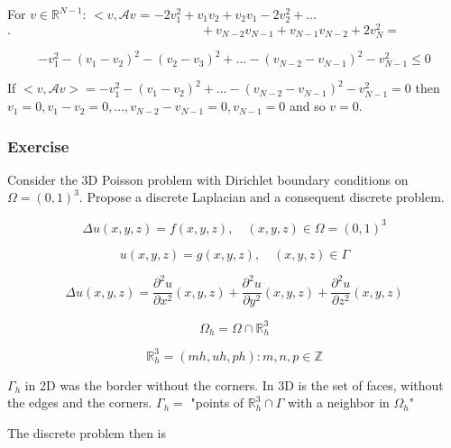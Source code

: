 For $v \in \mathbb{R}^{N-1}$: $<v, \mathcal{A}v$ = $-2 v_1^2 + v_1 v_2 + v_2 v_1 - 2 v_2^2 + \dots$\\
$. \qquad \quad \qquad \qquad \qquad \qquad \qquad \qquad  + v_{N-2} v_{N-1} + v_{N-1} v_{N-2} + 2 v_N^2 =$

\begin{equation*}
- v_1^2 - (v_1 - v_2)^2 - (v_2 - v_3)^2 + \dots - (v_{N-2} - v_{N-1})^2 - v_{N-1}^2 \le 0
\end{equation*}

If $<v, \mathcal{A}v> = - v_1^2 - (v_1 - v_2)^2 + \dots - (v_{N-2} - v_{N-1})^2 - v_{N-1}^2 = 0$ then $v_1 = 0, v_1 - v_2 = 0, \dots, v_{N-2} - v_{N-1} = 0, v_{N-1} = 0$ and so $v = 0$.


\subsubsection*{Exercise}

Consider the 3D Poisson problem with Dirichlet boundary conditions on $\Omega = (0, 1)^3$.
Propose a discrete Laplacian and a consequent discrete problem.

\begin{equation*}
\Delta u(x, y, z) = f(x, y, z), \quad (x, y, z) \in \Omega = (0, 1)^3
\end{equation*}

\begin{equation*}
u(x, y, z) = g(x, y, z), \quad (x, y, z) \in \Gamma
\end{equation*}

\begin{equation*}
\Delta u(x, y, z) = \frac{\partial^2 u}{\partial x^2} (x, y, z) + \frac{\partial^2 u}{\partial y^2} (x, y, z) + \frac{\partial^2 u}{\partial z^2} (x, y, z)
\end{equation*}

\begin{equation*}
\Omega_h = \Omega \cap \mathbb{R}^3_h
\end{equation*}

\begin{equation*}
\mathbb{R}^3_h = {(mh, uh, ph) : m,n,p \in \mathbb{Z}}
\end{equation*}

$\Gamma_h$ in 2D was the border without the corners. In 3D is the set of faces, without the edges and the corners.
$\Gamma_h = $ "points of $\mathbb{R}^3_h \cap \Gamma$ with a neighbor in $\Omega_h$"

The discrete problem then is 

